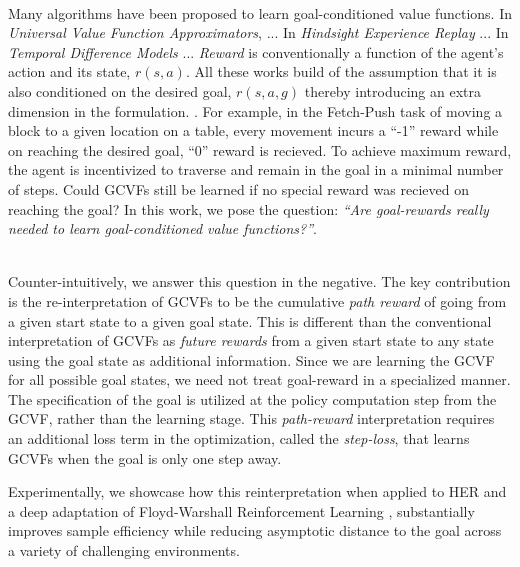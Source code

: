 \\
Many algorithms have been proposed to learn goal-conditioned value
functions. In \emph{Universal Value Function Approximators}, \cite{} ...
In \emph{Hindsight Experience Replay} ... In \emph{Temporal Difference
Models} ... \emph{Reward} is conventionally a function of the agent's
action and its state, $r(s,a)$. All these works build of the assumption
that it is also conditioned on the desired goal, $r(s,a,g)$ thereby
introducing an extra dimension in the formulation. . For example, in the
Fetch-Push task \citep{plappert2018multi} of moving a block to a given
location on a table, every movement incurs a ``-1'' reward while on
reaching the desired goal, ``0'' reward is recieved.  To achieve maximum
reward, the agent is incentivized to traverse and remain in the goal
in a minimal number of steps.  Could GCVFs still be learned if no
special reward was recieved on reaching the goal?  In this work,
we pose the question: \emph{``Are goal-rewards really needed to learn
goal-conditioned value functions?''}. 

\\
Counter-intuitively, we answer this question in the negative.  The key
contribution is the re-interpretation of GCVFs to be the cumulative
\emph{path reward} of going from a given start state to a given goal
state.  This is different than the conventional interpretation of GCVFs
as \emph{future rewards} from a given start state to any state using the
goal state as additional information.  
Since we are learning the GCVF for all possible goal states, we need not treat
goal-reward in a specialized manner. The specification of the goal is
utilized at the policy computation step from the GCVF, rather than the
learning stage. This \emph{path-reward} interpretation requires an
additional loss term in the optimization, called the
\emph{step-loss}, that learns GCVFs when the goal is only one step away. 

Experimentally, we showcase how this reinterpretation when applied to
HER and a deep adaptation of Floyd-Warshall Reinforcement Learning
\citep{}, substantially improves sample efficiency while reducing asymptotic distance to
the goal across a variety of challenging environments. 

